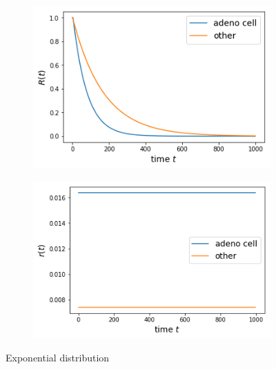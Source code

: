 \documentclass[10pt]{article}
\begin{document}
   
     \begin{figure}[htb!]
\centering
    \begin{subfigure}{.4\linewidth}
    \centering
    \includegraphics[width=.99\textwidth]{Images/cell/Sexp.png}
  \end{subfigure}%
    \begin{subfigure}{.4\linewidth}
    \centering
    \includegraphics[width=.99\textwidth]{Images/cell/rexp.png}
  \end{subfigure}%
  \caption{Exponential distribution}\label{fig:karexp} 
   \end{figure}   
   
\end{document}
